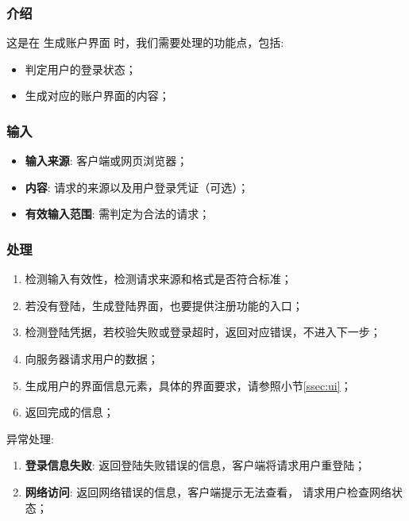 \subsubsection{介绍}
	这是在 生成账户界面 时，我们需要处理的功能点，包括: 
	\begin{itemize}
		\item 判定用户的登录状态；
		\item 生成对应的账户界面的内容；
	\end{itemize}
\subsubsection{输入}
	\begin{itemize}
		\item \textbf{输入来源}: 客户端或网页浏览器；
		\item \textbf{内容}: 请求的来源以及用户登录凭证（可选）；
		\item \textbf{有效输入范围}: 需判定为合法的请求；
	\end{itemize}
\subsubsection{处理}
	\begin{enumerate}
		\item 检测输入有效性，检测请求来源和格式是否符合标准；
		\item 若没有登陆，生成登陆界面，也要提供注册功能的入口；
		\item 检测登陆凭据，若校验失败或登录超时，返回对应错误，不进入下一步；
		\item 向服务器请求用户的数据；
		\item 生成用户的界面信息元素，具体的界面要求，请参照小节\ref{ssec:ui}；
		\item 返回完成的信息；
	\end{enumerate}
	\noindent 异常处理: 
	\begin{enumerate}
		\item \textbf{登录信息失败}: 返回登陆失败错误的信息，客户端将请求用户重登陆；
		\item \textbf{网络访问}: 返回网络错误的信息，客户端提示无法查看，
			请求用户检查网络状态；
	\end{enumerate}
